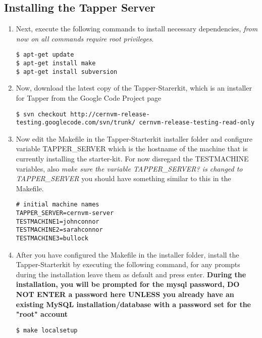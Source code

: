 \subsection{Installing the Tapper Server}
\begin{enumerate}
\item Next, execute the following commands to install necessary dependencies, \emph{from now on all commands require root privileges}.
\lstset{caption= Install Dependencies}
\begin{lstlisting}
$ apt-get update
$ apt-get install make
$ apt-get install subversion
\end{lstlisting}

\item Now, download the latest copy of the Tapper-Starerkit, which is an installer for Tapper from the \cernvmreleasetesting 
Google Code Project page
\lstset{caption= Download Tapper-Starterkit}
\begin{lstlisting}
$ svn checkout http://cernvm-release-testing.googlecode.com/svn/trunk/ cernvm-release-testing-read-only
\end{lstlisting}

\item Now edit the Makefile in the Tapper-Starterkit installer folder and configure variable TAPPER\_SERVER which 
is the hostname of the machine that is currently installing the starter-kit. For now disregard the TESTMACHINE 
variables, also \emph{make sure the variable TAPPER\_SERVER? is changed to TAPPER\_SERVER} you should have something
similar to this in the Makefile.
\lstset{caption= Makefile Configuration}
\begin{lstlisting}
# initial machine names
TAPPER_SERVER=cernvm-server
TESTMACHINE1=johnconnor
TESTMACHINE2=sarahconnor
TESTMACHINE3=bullock
\end{lstlisting}

\item After you have configured the Makefile in the installer folder, install the Tapper-Starterkit by executing the
following command, for any prompts during the installation leave them as default and press enter. {\bf During
the installation, you will be prompted for the mysql password, DO NOT ENTER a password here UNLESS you already have an
existing MySQL installation/database with a password set for the "root" account}
\lstset{caption= Install Tapper-Starterkit}
\begin{lstlisting}
$ make localsetup
\end{lstlisting}
\end{enumerate}

